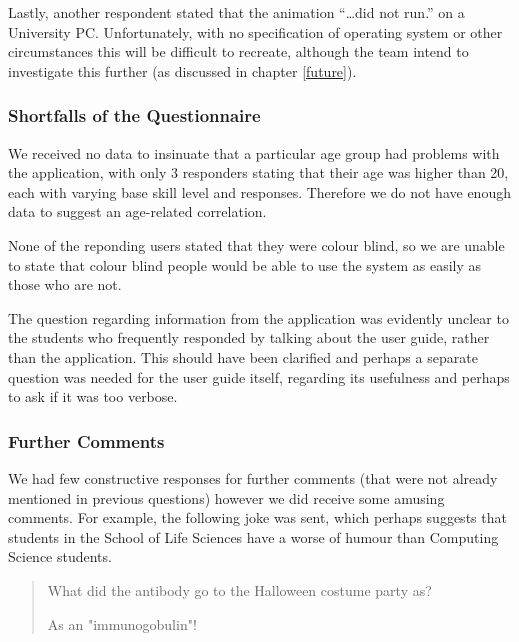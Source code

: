 Lastly, another respondent stated that the animation ``\ldots did not
run.'' on a University PC.
Unfortunately, with no specification of operating system or other
circumstances this will be difficult to recreate, although the team
intend to investigate this further (as discussed in chapter
\ref{future}).

\subsubsection{Shortfalls of the Questionnaire}
We received no data to insinuate that a particular age group had
problems with the application, with only 3 responders stating that
their age was higher than 20, each with varying base skill level and
responses.
Therefore we do not have enough data to suggest an age-related
correlation.

None of the reponding users stated that they were colour blind, so we
are unable to state that colour blind people would be able to use the
system as easily as those who are not.

The question regarding information from the application was evidently
unclear to the students who frequently responded by talking about the
user guide, rather than the application.
This should have been clarified and perhaps a separate question was
needed for the user guide itself, regarding its usefulness and perhaps
to ask if it was too verbose.

\subsubsection{Further Comments}

We had few constructive responses for further comments (that were not
already mentioned in previous questions) however we did receive some
amusing comments.
For example, the following joke was sent, which perhaps suggests that
students in the School of Life Sciences have a worse of humour than
Computing Science students.
\begin{quote}
What did the antibody go to the Halloween costume party as?

As an "immunogobulin"!
\end{quote}


